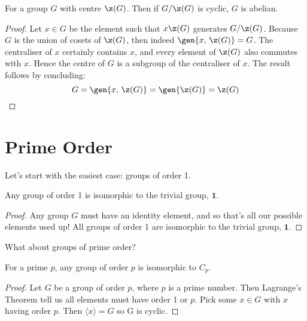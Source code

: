\begin{lemma}\label{lem:cyclic_over_centre}
    \raggedright
    For a group \(G\) with centre \(\z(G)\).
    Then if \(G/\z(G)\) is cyclic, \(G\) is abelian.
\end{lemma}

\begin{proof}
    Let \(x \in G\) be the element such that \(x\z(G)\) generates \(G/\z(G)\).
    Because \(G\) is the union of cosets of \(\z(G)\), then indeed \(\gen{x,\,\z(G)} = G\).
    The centraliser of \(x\) certainly contains \(x\), and every element of \(\z(G)\) also commutes with \(x\).
    Hence the centre of \(G\) is a subgroup of the centraliser of \(x\).
    The result follows by concluding:
    \[G = \gen{x,\,\z(G)} = \gen{\z(G)} = \z(G)\]
\end{proof}

\section{Prime Order}
Let's start with the easiest case: groups of order 1.
\begin{theorem}
    Any group of order 1 is isomorphic to the trivial group, \(\bm{1}\).
\end{theorem}

\begin{proof}
    Any group \(G\) must have an identity element, and so that's all our possible elements used up!
    All groups of order 1 are isomorphic to the trivial group, \(\bm{1}\).
\end{proof}


What about groups of prime order?
\begin{theorem}
    For a prime \(p\), any group of order \(p\) is isomorphic to \(C_p\).
\end{theorem}

\begin{proof}
    Let \(G\) be a group of order \(p\), where \(p\) is a prime number.
    Then Lagrange's Theorem tell us all elements must have order 1 or \(p\).
    Pick some \(x \in G\) with \(x\) having order \(p\).
    Then \(\langle x \rangle = G\) so G is cyclic.
\end{proof}

